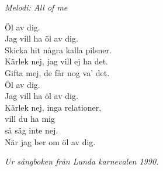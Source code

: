 {\footnotesize\textit{Melodi: All of me}}\par
\vspace{10pt}
Öl av dig.\\
Jag vill ha öl av dig.\\
Skicka hit några kalla pilsner.\\
Kärlek nej, jag vill ej ha det.\\
Gifta mej, de får nog va’ det.\\
Öl av dig.\\
Jag vill ha öl av dig.\\
Kärlek nej, inga relationer,\\
vill du ha mig\\
så säg inte nej.\\
När jag ber om öl av dig.\par
\vspace{10pt}
{\footnotesize\textit{Ur sångboken från Lunda karnevalen 1990.}}
